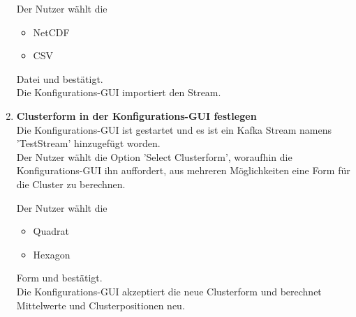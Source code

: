 \begin{enumerate}[label=\textbf{TI\arabic{enumi}0}]
		Der Nutzer wählt die
		\begin{itemize}
		\item NetCDF
		\item CSV
		\end{itemize}
		Datei und bestätigt.\\
		Die Konfigurations-GUI importiert den Stream.
	\item \textbf{Clusterform in der Konfigurations-GUI festlegen}\\
		Die Konfigurations-GUI ist gestartet und es ist ein Kafka Stream namens 'TestStream' hinzugefügt worden.\\
		Der Nutzer wählt die Option 'Select Clusterform', woraufhin die Konfigurations-GUI ihn auffordert, aus mehreren Möglichkeiten eine Form für die Cluster zu berechnen.\par
		
		Der Nutzer wählt die
		\begin{itemize}
		\item Quadrat
		\item Hexagon
		\end{itemize}
		Form und bestätigt.\\
		Die Konfigurations-GUI akzeptiert die neue Clusterform und berechnet Mittelwerte und Clusterpositionen neu.

\end{enumerate}

